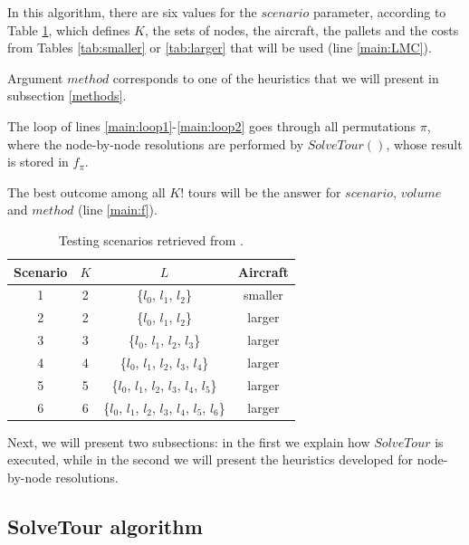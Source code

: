 \documentclass[preprint,authoryear]{elsarticle}
\begin{document}
In this algorithm, there are six values for the $scenario$\/ parameter, according to Table \ref{tab:scenarios}, which defines $K$, the sets of nodes, the aircraft, the pallets and the costs from Tables \ref{tab:smaller} or \ref{tab:larger} that will be used (line \ref{main:LMC}).

Argument $method$ corresponds to one of the heuristics that we will present in subsection \ref{methods}.

The loop of lines \ref{main:loop1}-\ref{main:loop2} goes through all permutations $\pi$, where the node-by-node resolutions are performed by $SolveTour()$, whose result is stored in $f_{\pi}$.

The best outcome among all $K!$ tours will be the answer for $scenario$, $volume$ and $method$ (line \ref{main:f}). 

\vspace{2.0mm}
\begin{table}[H]
	\centering
	\caption{Testing scenarios retrieved from \cite{MesquitaSanches2023}.}  \label{tab:scenarios}
	\begin{tabular}{c c c c }
		\toprule
		{\bf Scenario} & {$K$} & {$L$} & {\bf Aircraft} \\		
		\midrule
		1 & 2    & \{$l_0$, $l_1$, $l_2$\}                                 & smaller \\
		2 & 2    & \{$l_0$, $l_1$, $l_2$\}                                 & larger  \\
		3 & 3    & \{$l_0$, $l_1$, $l_2$, $l_3$\}                          & larger  \\
		4 & 4    & \{$l_0$, $l_1$, $l_2$, $l_3$, $l_4$\}                   & larger  \\
		5 & 5    & \{$l_0$, $l_1$, $l_2$, $l_3$, $l_4$, $l_5$\}            & larger  \\
		6 & 6    & \{$l_0$, $l_1$, $l_2$, $l_3$, $l_4$, $l_5$, $l_6$\}     & larger  \\
		\bottomrule
	\end{tabular}
\end{table}

Next, we will present two subsections: in the first we explain how $SolveTour$ is executed, while in the second we will present the heuristics developed for node-by-node resolutions.


\subsection{SolveTour algorithm}
\label{tour}
\end{document}
